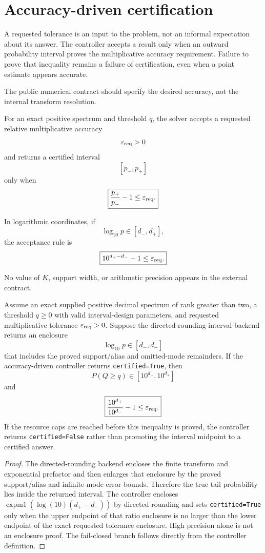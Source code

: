 \chapter{Accuracy-driven certification}\label{ch:accuracy}
A requested tolerance is an input to the problem, not an informal expectation
about its answer. The controller accepts a result only when an outward
probability interval proves the multiplicative accuracy requirement. Failure
to prove that inequality remains a failure of certification, even when a
point estimate appears accurate.
\label{sec:final-5}

The public numerical contract should specify the desired accuracy, not the
internal transform resolution.

For an exact positive spectrum and threshold \(q\), the solver accepts a
requested relative multiplicative accuracy
\[
\varepsilon_{\rm req}>0
\]
and returns a certified interval
\[
[p_-,p_+]
\]
only when
\[
\boxed{
\frac{p_+}{p_-}-1
\le
\varepsilon_{\rm req}.
}
\]

In logarithmic coordinates, if
\[
\log_{10}p\in[d_-,d_+],
\]
the acceptance rule is
\[
\boxed{
10^{d_+-d_-}-1
\le
\varepsilon_{\rm req}.
}
\]

No value of \(K\), support width, or arithmetic precision appears in the
external contract.

\begin{theorem}\label{claim:final-5-1}
Assume an exact supplied positive decimal spectrum of rank greater than two,
a threshold \(q\ge0\) with valid interval-design parameters, and requested multiplicative tolerance
\(\varepsilon_{\rm req}>0\).  Suppose the directed-rounding interval backend
returns an enclosure
\[
\log_{10}p\in[d_-,d_+]
\]
that includes the proved support/alias and omitted-mode remainders.  If the
accuracy-driven controller returns \texttt{certified=True}, then
\[
\boxed{
P(Q\ge q)\in[10^{d_-},10^{d_+}]
}
\]
and
\[
\boxed{
\frac{10^{d_+}}{10^{d_-}}-1
\le
\varepsilon_{\rm req}.
}
\]
If the resource caps are reached before this inequality is proved, the
controller returns \texttt{certified=False} rather than promoting the interval
midpoint to a certified answer.
\end{theorem}

\begin{proof}
The directed-rounding backend encloses the finite transform and exponential
prefactor and then enlarges that enclosure by the proved support/alias and
infinite-mode error bounds.  Therefore the true tail probability lies inside
the returned interval.  The controller encloses
\(\operatorname{expm1}(\log(10)(d_+-d_-))\) by directed rounding and
sets \texttt{certified=True} only when the upper endpoint of that ratio
enclosure is no larger than the lower endpoint of the exact requested
tolerance enclosure.  High precision alone is not an enclosure proof.  The fail-closed branch follows directly from
the controller definition.
\end{proof}

